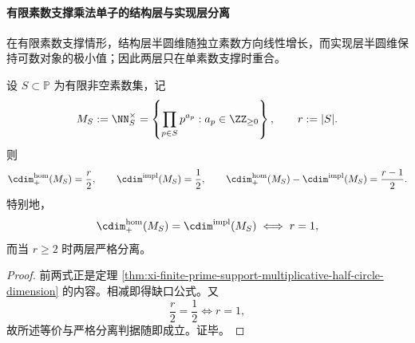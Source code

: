\paragraph{有限素数支撑乘法单子的结构层与实现层分离}
在有限素数支撑情形，结构层半圆维随独立素数方向线性增长，而实现层半圆维保持可数对象的极小值；因此两层只在单素数支撑时重合。

\begin{theorem}[有限素数支撑乘法单子的结构层与实现层精确分离]\label{thm:xi-finite-prime-support-halfdimension-gap-formula}
设 \(S\subset\mathbb P\) 为有限非空素数集，记
\[
M_S:=\NN_S^\times
=
\left\{\prod_{p\in S}p^{a_p}: a_p\in\ZZ_{\ge 0}\right\},
\qquad
r:=|S|.
\]
则
\[
\cdim^{\mathrm{hom}}_{+}(M_S)=\frac{r}{2},
\qquad
\cdim^{\mathrm{impl}}(M_S)=\frac12,
\qquad
\cdim^{\mathrm{hom}}_{+}(M_S)-\cdim^{\mathrm{impl}}(M_S)=\frac{r-1}{2}.
\]
特别地，
\[
\cdim^{\mathrm{hom}}_{+}(M_S)=\cdim^{\mathrm{impl}}(M_S)
\iff
r=1,
\]
而当 \(r\ge 2\) 时两层严格分离。
\end{theorem}
\begin{proof}
前两式正是定理 \ref{thm:xi-finite-prime-support-multiplicative-half-circle-dimension} 的内容。相减即得缺口公式。又
\[
\frac{r}{2}=\frac12
\iff
r=1,
\]
故所述等价与严格分离判据随即成立。证毕。
\end{proof}
